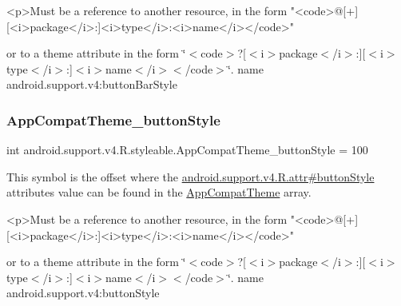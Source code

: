 \begin{DoxyVerb}      <p>Must be a reference to another resource, in the form "<code>@[+][<i>package</i>:]<i>type</i>:<i>name</i></code>"
\end{DoxyVerb}
 or to a theme attribute in the form \char`\"{}$<$code$>$?\mbox{[}$<$i$>$package$<$/i$>$\+:\mbox{]}\mbox{[}$<$i$>$type$<$/i$>$\+:\mbox{]}$<$i$>$name$<$/i$>$$<$/code$>$\char`\"{}.  name android.\+support.\+v4\+:button\+Bar\+Style \mbox{\label{classandroid_1_1support_1_1v4_1_1R_1_1styleable_a0a6f685c4d17c8080102fccc12ae235a}} 
\subsubsection{\texorpdfstring{App\+Compat\+Theme\+\_\+button\+Style}{AppCompatTheme\_buttonStyle}}
{\footnotesize\ttfamily int android.\+support.\+v4.\+R.\+styleable.\+App\+Compat\+Theme\+\_\+button\+Style = 100\hspace{0.3cm}{\ttfamily [static]}}

This symbol is the offset where the \hyperlink{classandroid_1_1support_1_1v4_1_1R_1_1attr_aa24d1272610cc52a96b5b53bcd08e9a7}{android.\+support.\+v4.\+R.\+attr\#button\+Style} attribute\textquotesingle{}s value can be found in the \hyperlink{classandroid_1_1support_1_1v4_1_1R_1_1styleable_ac07ebbe62ed977f6dcaadc6397840ace}{App\+Compat\+Theme} array.

\begin{DoxyVerb}      <p>Must be a reference to another resource, in the form "<code>@[+][<i>package</i>:]<i>type</i>:<i>name</i></code>"
\end{DoxyVerb}
 or to a theme attribute in the form \char`\"{}$<$code$>$?\mbox{[}$<$i$>$package$<$/i$>$\+:\mbox{]}\mbox{[}$<$i$>$type$<$/i$>$\+:\mbox{]}$<$i$>$name$<$/i$>$$<$/code$>$\char`\"{}.  name android.\+support.\+v4\+:button\+Style \mbox{\label{classandroid_1_1support_1_1v4_1_1R_1_1styleable_a94aeecf1f336663e0e81694de154135c}} 
